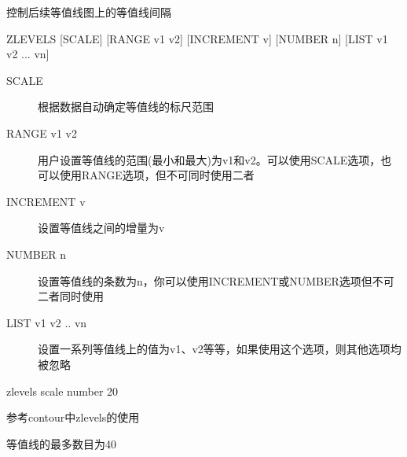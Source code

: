 \label{cmd:zlevels}

控制后续等值线图上的等值线间隔

\begin{SACSTX}
ZLEVELS [SCALE] [RANGE v1 v2] [INCREMENT v] [NUMBER n]
    [LIST v1 v2 ... vn]
\end{SACSTX}

\begin{description}
\item [SCALE] 根据数据自动确定等值线的标尺范围
\item [RANGE v1 v2] 用户设置等值线的范围(最小和最大)为v1和v2。可以使用SCALE选项，也可以使用RANGE选项，但不可同时使用二者
\item [INCREMENT v] 设置等值线之间的增量为v
\item [NUMBER n] 设置等值线的条数为n，你可以使用INCREMENT或NUMBER选项但不可二者同时使用
\item [LIST v1 v2 .. vn] 设置一系列等值线上的值为v1、v2等等，如果使用这个选项，则其他选项均被忽略
\end{description}

\begin{SACDFT}
zlevels scale number 20
\end{SACDFT}

参考contour中zlevels的使用

等值线的最多数目为40
